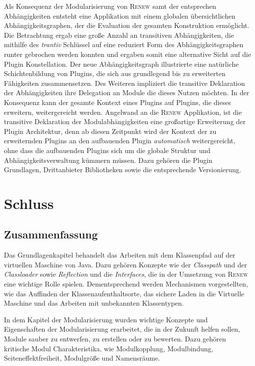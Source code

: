 Als Konsequenz der Modularisierung von \textsc{Renew} samt der entsprechen Abhängigkeiten entsteht eine Applikation mit einem globalen übersichtlichen Abhängigkeitsgraphen, der die Evaluation der gesamten Konstruktion ermöglicht. Die Betrachtung ergab eine große Anzahl an transitiven Abhängigkeiten, die mithilfe des \textit{trantiv} Schlüssel auf eine reduziert Form des Abhängigkeitsgraphen runter gebrochen werden konnten und ergaben somit eine alternative Sicht auf die Plugin Konstellation. Der neue Abhängigkeitsgraph illustrierte eine natürliche Schichtenbildung von Plugins, die sich aus grundlegend bis zu erweiterten Fähigkeiten zusammensetzen. Des Weiteren impliziert die transitive Deklaration der Abhängigkeiten ihre Delegation an Module die dieses Nutzen möchten. In der Konsequenz kann der gesamte Kontext eines Plugins auf Plugins, die dieses erweitern, weitergereicht werden. \newline
Angelwand an die \textsc{Renew} Applikation, ist die transitive Deklaration der Modulabhängigkeiten eine großartige Erweiterung der Plugin Architektur, denn ab diesen Zeitpunkt wird der Kontext der zu erweiternden Plugins an den aufbauenden Plugin \textit{automatisch} weitergereicht, ohne dass die aufbauenden Plugins sich um die globale Struktur und Abhängigkeitsverwaltung kümmern müssen. Dazu gehören die Plugin Grundlagen, Drittanbieter Bibliotheken sowie die entsprechende Versionierung. \newline



\chapter{Schluss}


\section{Zusammenfassung}

Das Grundlagenkapitel behandelt das Arbeiten mit dem Klassenpfad auf der virtuellen Maschine von Java. Dazu gehören Konzepte wie der \textit{Classpath} und der \textit{Classloader} sowie \textit{Reflection} und die \textit{Interfaces}, die in der Umsetzung von \textsc{Renew} eine wichtige Rolle spielen. Dementsprechend werden Mechanismen vorgestellten, wie das Auffinden der Klassenaufenthaltsorte, das sichere Laden in die Virtuelle Maschine und das Arbeiten mit unbekannten Klassentypen.\bigbreak

In dem Kapitel der Modularisierung wurden wichtige Konzepte und Eigenschaften der Modularisierung erarbeitet, die in der Zukunft helfen sollen, Module sauber zu entwerfen, zu erstellen oder zu bewerten. Dazu gehören kritische Modul Charakteristika, wie Modulkopplung, Modulbindung, Seiteneﬀektfreiheit, Modulgröße und Namensräume. \bigbreak

